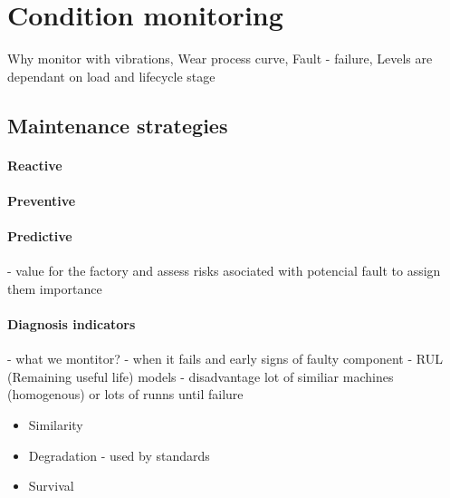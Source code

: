\section{Condition monitoring}
Why monitor with vibrations, 
Wear process curve, Fault - failure, Levels are dependant on load and lifecycle stage

\subsection{Maintenance strategies}
\paragraph{Reactive}
\paragraph{Preventive}
\paragraph{Predictive}
- value for the factory and assess risks asociated with potencial fault to assign them importance


\cite{torres_automatic_2022}
\cite{scheffer_practical_2004}
\cite{mohanty_machinery_2015}
\cite{davies_techniques_2012}
\cite{ziaran_technicka_2013}
\cite{cakir_experimental_2021}
\cite{noauthor_vibration_2000}

\cite{lengoc_vibration_1990}
\cite{chen_study_2014}

\paragraph{Diagnosis indicators} - what we montitor? - when it fails and early signs of faulty component
- RUL (Remaining useful life) models - disadvantage lot of similiar machines (homogenous) or lots of runns until failure
\begin{itemize}
\item Similarity
\item Degradation - used by standards
\item Survival
\end{itemize}


